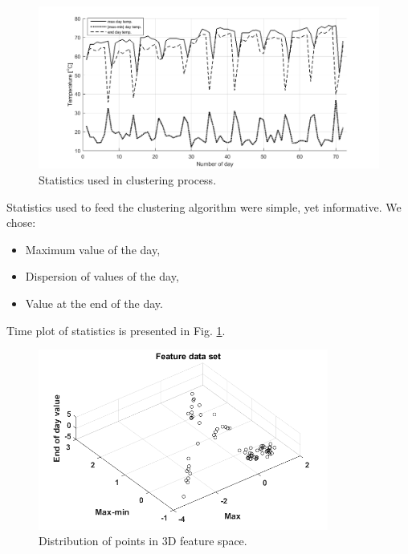 \begin{figure}[ht!]
\vspace{-15pt}
\centering
\includegraphics[width = \textwidth]{Wykresy/cluster_stats_day.png}
\caption{Statistics used in clustering process.}
\label{fig: cluster_stats_day}
\vspace{-15pt}
\end{figure}

Statistics used to feed the clustering algorithm were simple, yet informative. We chose:

\begin{itemize}
\renewcommand{\labelitemi}{$\bullet$}
\item Maximum value of the day,
\item Dispersion of values of the day,
\item Value at the end of the day.
\end{itemize}
Time plot of statistics is presented in Fig. \ref{fig: cluster_stats_day}.
\begin{figure}[ht!]
\centering
\includegraphics[width = 0.85\textwidth]{Wykresy/unclusteredbw.png}
\caption{Distribution of points in 3D feature space.}
\label{fig: unclusteredbw}
\vspace{-20pt}
\end{figure}


